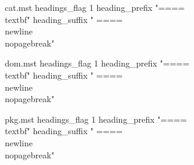\makeindex[name=cat,intoc=false] %
\begin{filecontents*}{cat.mst}
headings_flag 1
heading_prefix "{==== \\textbf{"
heading_suffix " ====\\newline}}\\nopagebreak\n"
\end{filecontents*}

\makeindex[name=dom,intoc=false] %
\begin{filecontents*}{dom.mst}
headings_flag 1
heading_prefix "{==== \\textbf{"
heading_suffix " ====\\newline}}\\nopagebreak\n"
\end{filecontents*}

\makeindex[name=pkg,intoc=false] %
\begin{filecontents*}{pkg.mst}
headings_flag 1
heading_prefix "{==== \\textbf{"
heading_suffix " ====\\newline}}\\nopagebreak\n"
\end{filecontents*}

\usepackage{hyperref} %

\usepackage[toc,page]{appendix} 

\usepackage{mathtools}

\usepackage{amssymb}

\usepackage{axiom} %

\usepackage{enumitem} %

\usepackage{bussproofs} 

